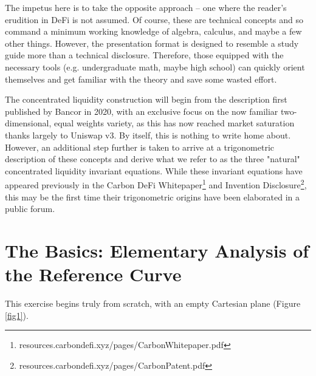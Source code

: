 \documentclass{article}
\begin{document}
The impetus here is to take the opposite approach – one where the reader’s erudition in DeFi is not assumed. Of course, these are technical concepts and so command a minimum working knowledge of algebra, calculus, and maybe a few other things. However, the presentation format is designed to resemble a study guide more than a technical disclosure. Therefore, those equipped with the necessary tools (e.g. undergraduate math, maybe high school) can quickly orient themselves and get familiar with the theory and save some wasted effort. 

The concentrated liquidity construction will begin from the description first published by Bancor in 2020, with an exclusive focus on the now familiar two-dimensional, equal weights variety, as this has now reached market saturation thanks largely to Uniswap v3. By itself, this is nothing to write home about. However, an additional step further is taken to arrive at a trigonometric description of these concepts and derive what we refer to as the three "natural" concentrated liquidity invariant equations. While these invariant equations have appeared previously in the Carbon DeFi Whitepaper\footnote{resources.carbondefi.xyz/pages/CarbonWhitepaper.pdf} and Invention Disclosure\footnote{resources.carbondefi.xyz/pages/CarbonPatent.pdf}, this may be the first time their trigonometric origins have been elaborated in a public forum. 

\section{The Basics: Elementary Analysis of the Reference Curve}\label{sec2}

This exercise begins truly from scratch, with an empty Cartesian plane (Figure \ref{fig1}).
\end{document}
